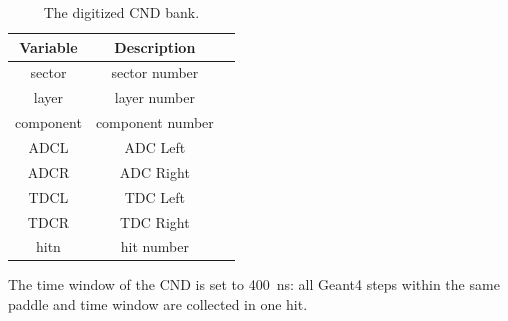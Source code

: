 \begin{table}[h]
	\begin{center}
		\begin{tabular}{| c | c | c |}
			\hline \hline
			Variable  &          Description     \\
			\hline
              sector  &        sector number     \\
               layer  &         layer number     \\
           component  &     component number     \\
                ADCL  &             ADC Left     \\
                ADCR  &            ADC Right     \\
                TDCL  &             TDC Left     \\
                TDCR  &            TDC Right     \\
                hitn  &           hit number     \\
			\hline \hline
		\end{tabular}
	\end{center}
	\caption{The digitized CND bank.}\label{tab:cndBank}
\end{table}

The time window  of the CND is set to 400~ns: all Geant4 steps within the same paddle and time window are collected
in one hit.

